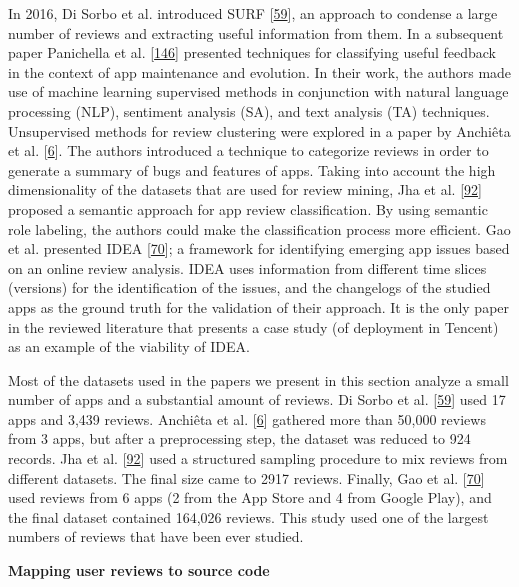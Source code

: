 \documentclass[]{book}
\begin{document}
In 2016, Di Sorbo et al. introduced SURF
{[}\protect\hyperlink{ref-di2016would}{59}{]}, an approach to condense a
large number of reviews and extracting useful information from them. In
a subsequent paper Panichella et al.
{[}\protect\hyperlink{ref-panichella2016ardoc}{146}{]} presented
techniques for classifying useful feedback in the context of app
maintenance and evolution. In their work, the authors made use of
machine learning supervised methods in conjunction with natural language
processing (NLP), sentiment analysis (SA), and text analysis (TA)
techniques. Unsupervised methods for review clustering were explored in
a paper by Anchiêta et al.
{[}\protect\hyperlink{ref-anchieta2017}{6}{]}. The authors introduced a
technique to categorize reviews in order to generate a summary of bugs
and features of apps. Taking into account the high dimensionality of the
datasets that are used for review mining, Jha et al.
{[}\protect\hyperlink{ref-jha2017mining}{92}{]} proposed a semantic
approach for app review classification. By using semantic role labeling,
the authors could make the classification process more efficient. Gao et
al. presented IDEA {[}\protect\hyperlink{ref-gao2018online}{70}{]}; a
framework for identifying emerging app issues based on an online review
analysis. IDEA uses information from different time slices (versions)
for the identification of the issues, and the changelogs of the studied
apps as the ground truth for the validation of their approach. It is the
only paper in the reviewed literature that presents a case study (of
deployment in Tencent) as an example of the viability of IDEA.

Most of the datasets used in the papers we present in this section
analyze a small number of apps and a substantial amount of reviews. Di
Sorbo et al. {[}\protect\hyperlink{ref-di2016would}{59}{]} used 17 apps
and 3,439 reviews. Anchiêta et al.
{[}\protect\hyperlink{ref-anchieta2017}{6}{]} gathered more than 50,000
reviews from 3 apps, but after a preprocessing step, the dataset was
reduced to 924 records. Jha et al.
{[}\protect\hyperlink{ref-jha2017mining}{92}{]} used a structured
sampling procedure to mix reviews from different datasets. The final
size came to 2917 reviews. Finally, Gao et al.
{[}\protect\hyperlink{ref-gao2018online}{70}{]} used reviews from 6 apps
(2 from the App Store and 4 from Google Play), and the final dataset
contained 164,026 reviews. This study used one of the largest numbers of
reviews that have been ever studied.

\textbf{Mapping user reviews to source code}
\end{document}
